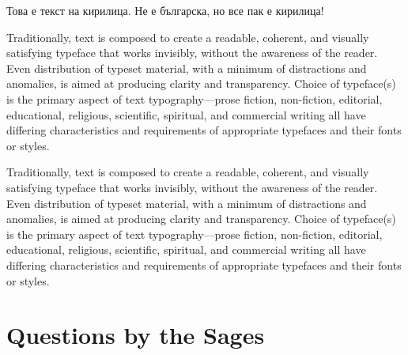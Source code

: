 \documentclass[twoside]{purana}
\begin{document}

Това е текст на кирилица. Не е българска, но все пак е кирилица!

\begin{quote}
\end{quote}

Traditionally, text is composed to create a readable, coherent, and visually satisfying typeface that works invisibly, without the awareness of the reader. Even distribution of typeset material, with a minimum of distractions and anomalies, is aimed at producing clarity and transparency. Choice of typeface(s) is the primary aspect of text typography—prose fiction, non-fiction, editorial, educational, religious, scientific, spiritual, and commercial writing all have differing characteristics and requirements of appropriate typefaces and their fonts or styles.


Traditionally, text is composed to create a readable, coherent, and visually satisfying typeface that works invisibly, without the awareness of the reader. Even distribution of typeset material, with a minimum of distractions and anomalies, is aimed at producing clarity and transparency. Choice of typeface(s) is the primary aspect of text typography—prose fiction, non-fiction, editorial, educational, religious, scientific, spiritual, and commercial writing all have differing characteristics and requirements of appropriate typefaces and their fonts or styles.

\begin{quote}
\end{quote}

\chapter{Questions by the Sages}
\end{document}

